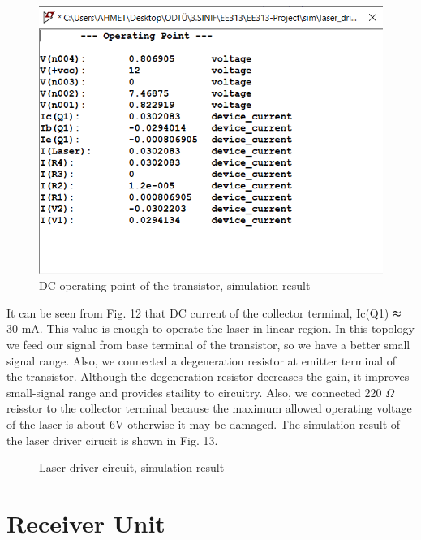 \documentclass[conference]{IEEEtran}
\begin{document}
 \begin{figure}[H]
   \centerline{\includegraphics[scale=0.5]{DC_operating.png}}
    \caption{DC operating point of the transistor, simulation result}
\end{figure} 
\par It can be seen from Fig. 12 that DC current of the collector terminal, Ic(Q1) \(\thickapprox \) 30 mA. This value is enough to operate the laser in linear region. In this topology we feed our signal from base terminal of the transistor, so we have a better small signal range. Also, we connected a degeneration resistor at emitter terminal of the transistor. Although the degeneration resistor decreases the gain, it improves small-signal range and provides staility to circuitry. Also, we connected 220 \(\Omega\) reisstor to the collector terminal because the maximum allowed operating voltage of the laser is about 6V otherwise it may be damaged. The simulation result of the laser driver cirucit is shown in Fig. 13.  
 \begin{figure}[H]
   \centerline{}
    \caption{Laser driver circuit, simulation result}
\end{figure} 

\section{Receiver Unit}
\end{document}
